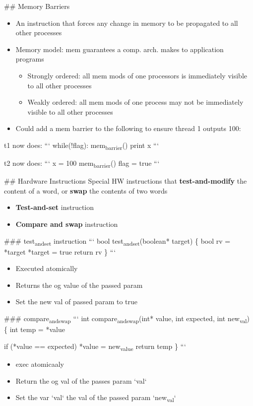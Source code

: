 \documentclass[11pt]{article}
\begin{document}
\#\# Memory Barriers
\begin{itemize}
\item An instruction that forces any change in memory to be propagated to all other processes
\item Memory model: mem guarantees a comp. arch. makes to application programs
\begin{itemize}
\item Strongly ordered: all mem mods of one processors is immediately visible to all other processes
\item Weakly ordered: all mem mods of one process may not be immediately visible to all other processes
\end{itemize}

\item Could add a mem barrier to the following to ensure thread 1 outputs 100:
\end{itemize}
t1 now does:
```
while(!flag):
  mem\textsubscript{barrier}()
print x
```

t2 now does:
```
x = 100
mem\textsubscript{barrier}()
flag = true
```

\#\# Hardware Instructions
Special HW instructions that \textbf{test-and-modify} the content of a word, or \textbf{swap} the contents of two words
\begin{itemize}
\item \textbf{\textbf{Test-and-set}} instruction
\item \textbf{\textbf{Compare and swap}} instruction
\end{itemize}

\#\#\# test\textsubscript{and}\textsubscript{set} instruction
```
bool test\textsubscript{and}\textsubscript{set}(boolean* target) \{
  bool rv = *target
  *target = true
  return rv
\}
```
\begin{itemize}
\item Executed atomically
\item Returns the og value of the passed param
\item Set the new val of passed param to true
\end{itemize}

\#\#\# compare\textsubscript{and}\textsubscript{swap}
```
int compare\textsubscript{and}\textsubscript{swap}(int* value, int expected, int new\textsubscript{val}) \{
  int temp = *value

  if (*value == expected)
    *value = new\textsubscript{value}
  return temp
\}
```
\begin{itemize}
\item exec atomicaaly
\item Return the og val of the passes param `val`
\item Set the var `val` the val of the passed param `new\textsubscript{val}`
\end{itemize}
\end{document}
